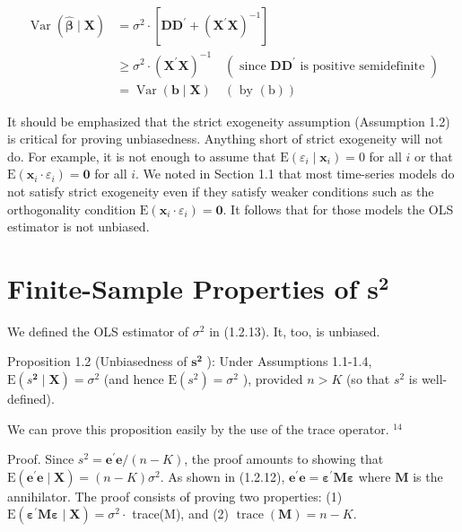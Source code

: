\documentclass[10pt]{article}
\begin{document}
$$
\begin{aligned}
\operatorname{Var}(\widehat{\boldsymbol{\beta}} \mid \mathbf{X}) & =\sigma^{2} \cdot\left[\mathbf{D \mathbf { D } ^ { \prime }}+\left(\mathbf{X}^{\prime} \mathbf{X}\right)^{-1}\right] \\
& \geq \sigma^{2} \cdot\left(\mathbf{X}^{\prime} \mathbf{X}\right)^{-1} \quad\left(\text { since } \mathbf{D D}^{\prime} \text { is positive semidefinite }\right) \\
& =\operatorname{Var}(\mathbf{b} \mid \mathbf{X}) \quad(\text { by }(\mathrm{b}))
\end{aligned}
$$

It should be emphasized that the strict exogeneity assumption (Assumption 1.2) is critical for proving unbiasedness. Anything short of strict exogeneity will not do. For example, it is not enough to assume that $\mathrm{E}\left(\varepsilon_{i} \mid \mathbf{x}_{i}\right)=0$ for all $i$ or that $\mathrm{E}\left(\mathbf{x}_{i} \cdot \varepsilon_{i}\right)=\mathbf{0}$ for all $i$. We noted in Section 1.1 that most time-series models do not satisfy strict exogeneity even if they satisfy weaker conditions such as the orthogonality condition $\mathrm{E}\left(\mathbf{x}_{i} \cdot \varepsilon_{i}\right)=\mathbf{0}$. It follows that for those models the OLS estimator is not unbiased.

\section*{Finite-Sample Properties of $\boldsymbol{s}^{\mathbf{2}}$}
We defined the OLS estimator of $\sigma^{2}$ in (1.2.13). It, too, is unbiased.

Proposition 1.2 (Unbiasedness of $\boldsymbol{s}^{\mathbf{2}}$ ): Under Assumptions 1.1-1.4, $\mathrm{E}\left(s^{\mathbf{2}} \mid \mathbf{X}\right)= \sigma^{2}$ (and hence $\mathrm{E}\left(s^{2}\right)=\sigma^{2}$ ), provided $n>K$ (so that $s^{2}$ is well-defined).

We can prove this proposition easily by the use of the trace operator. ${ }^{14}$

Proof. Since $s^{2}=\mathbf{e}^{\prime} \mathbf{e} /(n-K)$, the proof amounts to showing that $\mathrm{E}\left(\mathbf{e}^{\prime} \mathbf{e} \mid \mathbf{X}\right)= (n-K) \sigma^{2}$. As shown in (1.2.12), $\mathbf{e}^{\prime} \mathbf{e}=\boldsymbol{\varepsilon}^{\prime} \mathbf{M} \boldsymbol{\varepsilon}$ where $\mathbf{M}$ is the annihilator. The proof consists of proving two properties: (1) $\mathrm{E}\left(\boldsymbol{\varepsilon}^{\prime} \mathbf{M} \boldsymbol{\varepsilon} \mid \mathbf{X}\right)=\sigma^{2} \cdot$ trace(M), and (2) $\operatorname{trace}(\mathbf{M})=n-K$.
\end{document}
